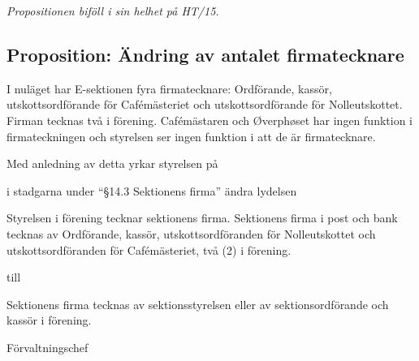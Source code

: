 \documentclass[../_main/handlingar.tex]{subfiles}
\begin{document}

\emph{Propositionen biföll i sin helhet på HT/15.}

\subsection*{Proposition: Ändring av antalet firmatecknare}
I nuläget har E-sektionen fyra firmatecknare: Ordförande, kassör, utskottsordförande för Cafémästeriet och utskottsordförande för Nolleutskottet. Firman tecknas två i förening. Cafémästaren och Øverphøset har ingen funktion i firmateckningen och styrelsen ser ingen funktion i att de är firmatecknare.

Med anledning av detta yrkar styrelsen på
\begin{attsatser}
    \att i stadgarna under ``\S14.3 Sektionens firma'' ändra lydelsen\par
    \begin{itshape}
      Styrelsen i förening tecknar sektionens firma. Sektionens firma i post och bank tecknas av Ordförande, kassör, utskottsordföranden för Nolleutskottet och utskottsordföranden för Cafémästeriet, två (2) i förening.
    \end{itshape}\par
    till\par
    \begin{itshape}
      Sektionens firma tecknas av sektionsstyrelsen eller av sektionsordförande och kassör i förening.
    \end{itshape}
\end{attsatser}

\begin{signatures}{1}
    \ist
    \signature{Henrik Felding}{Förvaltningschef}
\end{signatures}
\end{document}
